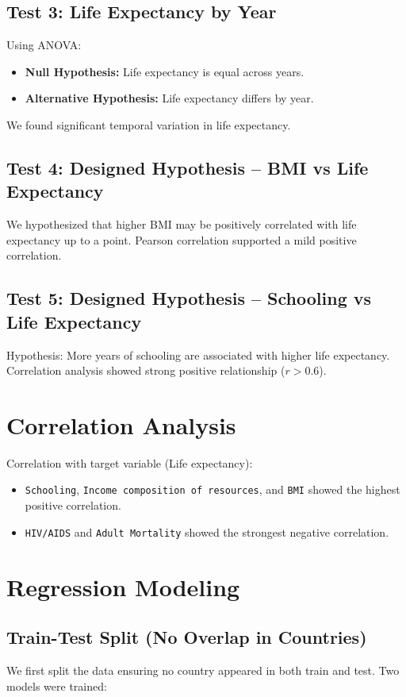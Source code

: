 \documentclass[11pt]{article}
\begin{document}
\subsection{Test 3: Life Expectancy by Year}
Using ANOVA:
\begin{itemize}
    \item \textbf{Null Hypothesis:} Life expectancy is equal across years.
    \item \textbf{Alternative Hypothesis:} Life expectancy differs by year.
\end{itemize}
We found significant temporal variation in life expectancy.

\subsection{Test 4: Designed Hypothesis – BMI vs Life Expectancy}
We hypothesized that higher BMI may be positively correlated with life expectancy up to a point. Pearson correlation supported a mild positive correlation.

\subsection{Test 5: Designed Hypothesis – Schooling vs Life Expectancy}
Hypothesis: More years of schooling are associated with higher life expectancy. Correlation analysis showed strong positive relationship ($r > 0.6$).

\section{Correlation Analysis}
Correlation with target variable (Life expectancy):

\begin{itemize}
    \item \texttt{Schooling}, \texttt{Income composition of resources}, and \texttt{BMI} showed the highest positive correlation.
    \item \texttt{HIV/AIDS} and \texttt{Adult Mortality} showed the strongest negative correlation.
\end{itemize}

\section{Regression Modeling}

\subsection{Train-Test Split (No Overlap in Countries)}
We first split the data ensuring no country appeared in both train and test. Two models were trained:
\end{document}

